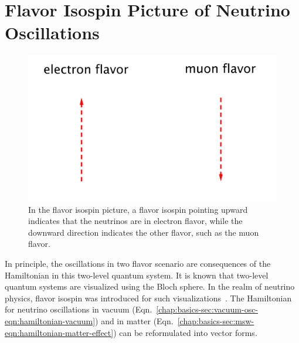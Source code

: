 \section{\label{chap:basics-sec:flavor-isospin-pic}Flavor Isospin Picture of Neutrino Oscillations}


\begin{figure}
    \centering
    \vspace*{-10pt}
    \includegraphics[width=\textwidth]{chapters/assets/basics/flavor-isospin-illus}
    \caption{In the flavor isospin picture, a flavor isospin pointing upward indicates that the neutrinos are in electron flavor, while the downward direction indicates the other flavor, such as the muon flavor.}
    \label{chap:basics-sec:flavor-isospin-pic-fig:flavor-isospin-illus}
\end{figure}

In principle, the oscillations in two flavor scenario are consequences of the Hamiltonian in this two-level quantum system. It is known that two-level quantum systems are visualized using the Bloch sphere. In the realm of neutrino physics, flavor isospin was introduced for such visualizations~\cite{Duan2006b}. The Hamiltonian for neutrino oscillations in vacuum (Eqn.~\ref{chap:basics-sec:vacuum-osc-eqn:hamiltonian-vacuum}) and in matter (Eqn.~\ref{chap:basics-sec:msw-eqn:hamiltonian-matter-effect}) can be reformulated into vector forms.

